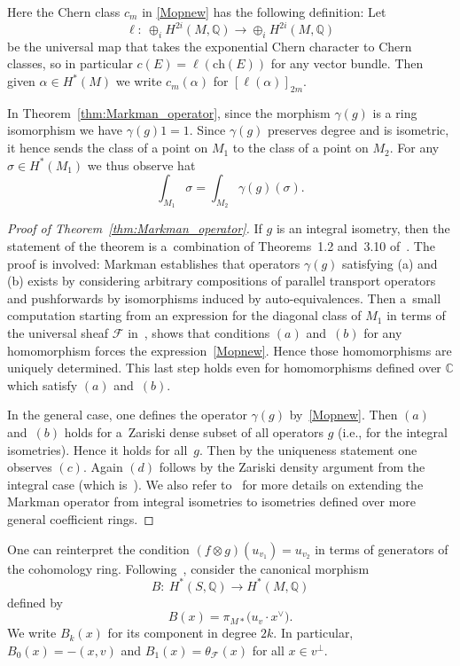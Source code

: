 \documentclass[11pt]{article}
\numberwithin{equation}{section}
\numberwithin{equation}{section}
\newcommand{\BC}{{\mathbb{C}}}
\newcommand{\BQ}{{\mathbb{Q}}}
\newcommand{\CF}{{\mathcal F}}
\newcommand{\ch}{{\mathrm{ch}}}
\newcommand{\1}{\mathsf{1}}
\begin{document}
\begin{rmk} \label{rmk: c applied to coh class}
Here the Chern class $c_m$ in \eqref{Mopnew} has the following definition:
Let
\[
\ell \colon \ \oplus_i H^{2i}(M,\BQ) \to \oplus_i H^{2i}(M,\BQ)
\]
be the universal map that takes the exponential Chern character to Chern classes,
so in particular $c(E) = \ell( \ch(E) )$ for any vector bundle.
Then given $\alpha \in H^{\ast}(M)$ we write $c_m(\alpha)$ for $\left[ \ell(\alpha) \right]_{2m}$.
\end{rmk}

\begin{rmk}
In Theorem~\ref{thm:Markman_operator}, since the morphism $\gamma(g)$ is a ring isomorphism we have $\gamma(g)1 = 1$. Since $\gamma(g)$ preserves degree and is isometric,
it hence sends the class of a point on $M_1$ to the class of a point on $M_2$. For any $\sigma \in H^{\ast}(M_1)$ we thus observe hat
\[ \int_{M_1} \sigma = \int_{M_2} \gamma(g)(\sigma). \]
\end{rmk}

\begin{proof}[Proof of Theorem~\ref{thm:Markman_operator}]
If $g$ is an integral isometry, then the
statement of the theorem is a~combination
of Theorems~1.2 and~3.10 of~\cite{Markman}.
The proof is involved: Markman establishes that operators $\gamma(g)$ satisfying (a) and (b) exists
by considering arbitrary compositions of parallel transport operators and pushforwards by isomorphisms induced by auto-equivalences.
Then a~small computation starting from an expression for the diagonal class of $M_1$ in terms of the universal sheaf $\CF$ in~\cite{MarkmanGenerators},
shows that conditions $(a)$ and~$(b)$ for any homomorphism forces the expression~\eqref{Mopnew}.
Hence those homomorphisms are uniquely determined.
This last step holds even for homomorphisms defined over $\BC$ which satisfy $(a)$ and~$(b)$.

In the general case, one defines the operator $\gamma(g)$ by~\eqref{Mopnew}.
Then $(a)$ and~$(b)$ holds for a~Zariski dense subset of all operators $g$ (i.e., for the integral isometries).
Hence it holds for all~$g$. Then by the uniqueness statement one observes $(c)$. Again $(d)$ follows by the Zariski density argument from the integral case
(which is~\cite[Theorem~1.2(6)]{Markman}).
We also refer to~\cite[Proposition 5.1]{Frei} for more details on extending the Markman operator from integral isometries to isometries defined over more general coefficient rings.
\end{proof}
One can reinterpret the condition $(f \otimes g)(u_{v_1}) = u_{v_2}$ in terms of generators of the cohomology ring.
Following~\cite[equation~(3.23)]{Markman}, consider the canonical morphism
\[
B \colon \ H^{\ast}(S,\BQ) \to H^{\ast}(M,\BQ)
\]
defined by
\[
B(x) = \pi_{M \ast}\big( u_{v} \cdot x^{\vee} \big).
\]
We write $B_k(x)$ for its component in degree $2k$. In particular,
$B_0(x) = -(x,v)$ and
$B_1(x) = \theta_{\CF}(x)$ for all $x \in v^{\perp}$.
\end{document}
